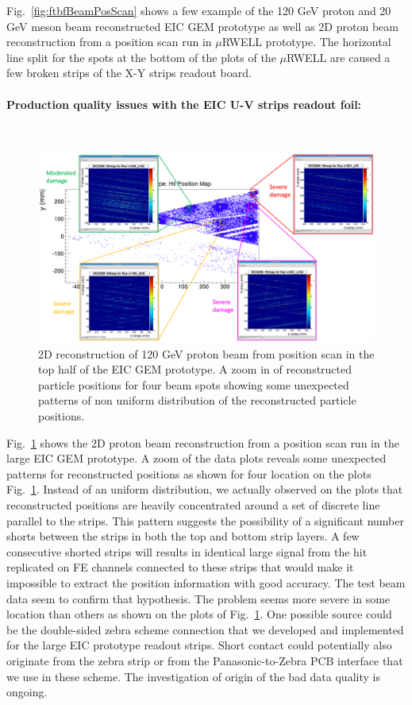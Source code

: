 %
Fig.~\ref{fig:ftbfBeamPosScan} shows a few example of the 120 GeV proton and 20 GeV meson beam reconstructed EIC GEM prototype as well as 2D proton beam reconstruction from a position scan run in $\mu$RWELL prototype. The horizontal line split for the spots at the bottom of the plots of the $\mu$RWELL are caused a few broken strips of the X-Y strips readout board.
%
\paragraph*{Production quality issues with the EIC U-V strips readout foil:}\mbox{}\\
\begin{figure}[htb]
\centering
\includegraphics[width=1\columnwidth,trim={0pt 0mm 0pt 0mm},clip]{UVa_plots/eicPosScan}
\caption{\label{fig:eicPosScan}  2D  reconstruction of 120 GeV proton beam from position scan in the top half of the EIC GEM prototype. A zoom in of  reconstructed particle positions for four beam spots showing some unexpected patterns of non uniform distribution of the reconstructed particle positions.}
\end{figure}
Fig.~\ref{fig:eicPosScan} shows the 2D proton beam reconstruction from a position scan run in the large EIC GEM prototype. A zoom of the data plots reveals some unexpected patterns for reconstructed positions as shown for four location on the plots Fig.~\ref{fig:eicPosScan}. Instead of an uniform distribution, we actually observed on the plots that reconstructed positions are heavily concentrated around a set of discrete line parallel to the strips. This pattern suggests the possibility of a significant number shorts between the strips in both the top and bottom strip layers. A few consecutive shorted strips will results in identical large signal from the hit replicated on FE channels connected to these strips that would make it impossible to extract the  position information with good accuracy. The test beam data  seem to confirm that hypothesis. The problem seems more severe in some location than others as shown on the plots of Fig.~\ref{fig:eicPosScan}.  One possible source could be the double-sided zebra scheme connection that we developed and implemented for the large EIC prototype readout strips. Short contact could potentially also originate from the zebra strip or from the Panasonic-to-Zebra PCB interface that we use in these scheme. The investigation of origin of the bad data quality is ongoing.
%
